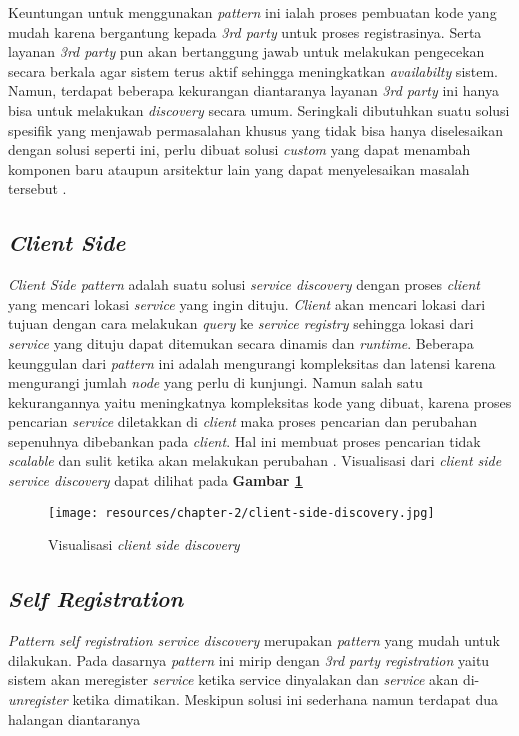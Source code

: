 Keuntungan untuk menggunakan \textit{pattern} ini ialah proses pembuatan kode yang mudah karena bergantung kepada \textit{3rd party} untuk proses registrasinya. Serta layanan \textit{3rd party} pun akan bertanggung jawab untuk melakukan pengecekan secara berkala agar sistem terus aktif sehingga meningkatkan \textit{availabilty} sistem. Namun, terdapat beberapa kekurangan diantaranya layanan \textit{3rd party} ini hanya bisa untuk melakukan \textit{discovery} secara umum. Seringkali dibutuhkan suatu solusi spesifik yang menjawab permasalahan khusus yang tidak bisa hanya diselesaikan dengan solusi seperti ini, perlu dibuat solusi \textit{custom} yang dapat menambah komponen baru ataupun arsitektur lain yang dapat menyelesaikan masalah tersebut \parencite{3rdpartyintegration}.

\subsection{\textit{Client Side}}
\textit{Client Side pattern} adalah suatu solusi \textit{service discovery} dengan proses \textit{client} yang mencari lokasi \textit{service} yang ingin dituju. \textit{Client} akan mencari lokasi dari tujuan dengan cara melakukan \textit{query} ke \textit{service registry} sehingga lokasi dari \textit{service} yang dituju dapat ditemukan secara dinamis dan \textit{runtime}. Beberapa keunggulan dari \textit{pattern} ini adalah mengurangi kompleksitas dan latensi karena mengurangi jumlah \textit{node} yang perlu di kunjungi. Namun salah satu kekurangannya yaitu meningkatnya kompleksitas kode yang dibuat, karena proses pencarian \textit{service} diletakkan di \textit{client} maka proses pencarian dan perubahan sepenuhnya dibebankan pada \textit{client}. Hal ini membuat proses pencarian tidak \textit{scalable} dan sulit ketika akan melakukan perubahan \parencite{clientsidediscovery}. Visualisasi dari \textit{client side service discovery} dapat dilihat pada \textbf{Gambar \ref{fig:client-side-discovery}}

\begin{figure}[ht]
  \centering
  \texttt{[image: resources/chapter-2/client-side-discovery.jpg]}
  \caption{Visualisasi \textit{client side discovery} \parencite{clientsidediscovery} }
  \label{fig:client-side-discovery}
\end{figure}

\subsection{\textit{Self Registration}}
\textit{Pattern self registration service discovery} merupakan \textit{pattern} yang mudah untuk dilakukan. Pada dasarnya \textit{pattern} ini mirip dengan \textit{3rd party registration} yaitu sistem akan meregister \textit{service} ketika service dinyalakan dan \textit{service} akan di-\textit{unregister} ketika dimatikan. Meskipun solusi ini sederhana namun terdapat dua halangan diantaranya

